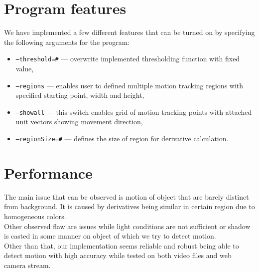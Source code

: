 \documentclass[12pt,a4paper,twocolumn]{article}
\begin{document}
\section*{Program features}
We have implemented a few different features that can be turned on by specifying the following arguments for the program:
\begin{itemize}
\item \texttt{--threshold=\textit{\#}} --- overwrite implemented thresholding function with fixed value,
\item \texttt{--regions} --- enables user to defined multiple motion tracking regions with specified starting point, width and height,
\item \texttt{--showall} --- this switch enables grid of motion tracking points with attached unit vectors showing movement direction,
\item \texttt{--regionSize=\textit{\#}} --- defines the size of region for derivative calculation.
\end{itemize}

\section*{Performance}
The main issue that can be observed is motion of object that are barely distinct from background. It is caused by derivatives being similar in certain region due to homogeneous colors.\\
Other observed flaw are issues while light conditions are not sufficient or shadow is casted in some manner on object of which we try to detect motion.\\

Other than that, our implementation seems reliable and robust being able to detect motion with high accuracy while tested on both video files and web camera stream.
\end{document}
